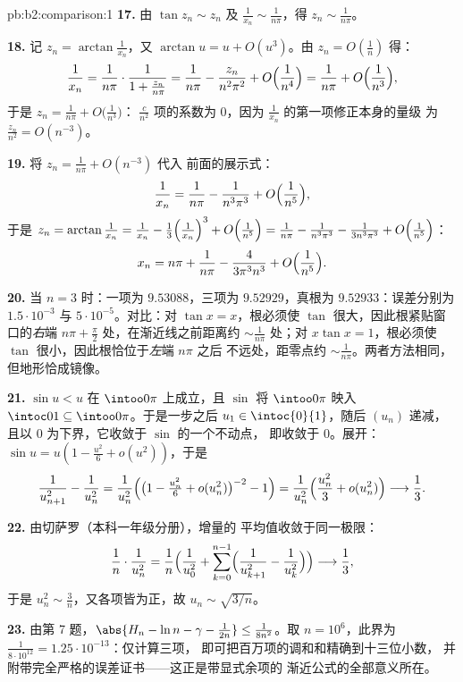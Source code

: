 \begin{solution}{pb:b2:comparison:1}
\textbf{17.} 由 $\tan z_n \sim z_n$ 及 $\frac1{x_n} \sim
\frac1{n\pi}$，得 $z_n \sim \frac1{n\pi}$。

\textbf{18.} 记 $z_n = \arctan\frac1{x_n}$，又 $\arctan u = u +
O(u^3)$。由 $z_n = O(\frac1n)$ 得：
\[
\frac1{x_n} = \frac{1}{n\pi}\cdot\frac1{1 + \frac{z_n}{n\pi}}
= \frac1{n\pi} - \frac{z_n}{n^2\pi^2} +
O\Bigl(\frac1{n^4}\Bigr)
= \frac1{n\pi} + O\Bigl(\frac1{n^3}\Bigr),
\]
于是 $z_n = \frac1{n\pi} + O\bigl(\frac1{n^3}\bigr)$：
$\frac{c}{n^2}$ 项的系数为 $0$，因为
$\frac1{x_n}$ 的第一项修正本身的量级
为 $\frac{z_n}{n^2} = O(n^{-3})$。

\textbf{19.} 将 $z_n = \frac1{n\pi} + O(n^{-3})$ 代入
前面的展示式：
\[
\frac{1}{x_n} = \frac{1}{n\pi} - \frac{1}{n^3\pi^3} +
O\Bigl(\frac1{n^5}\Bigr),
\]
于是 $z_n = \arctan\frac1{x_n} = \frac1{x_n} -
\frac{1}{3}\Bigl(\frac1{x_n}\Bigr)^3 + O\Bigl(\frac1{n^5}\Bigr)
= \frac1{n\pi} - \frac{1}{n^3\pi^3} - \frac{1}{3n^3\pi^3} +
O\Bigl(\frac1{n^5}\Bigr)$：
\[
x_n = n\pi + \frac{1}{n\pi} - \frac{4}{3\pi^3n^3} +
O\Bigl(\frac1{n^5}\Bigr).
\]

\textbf{20.} 当 $n = 3$ 时：一项为 $9.53088$，三项为
$9.52929$，真根为 $9.52933$：误差分别为 $1.5\cdot10^{-3}$ 与
$5\cdot10^{-5}$。对比：对 $\tan x = x$，根必须使
$\tan$ 很大，因此根紧贴窗口的\emph{右}端 $n\pi +
\frac\pi2$ 处，在渐近线之前距离约 $\sim\frac1{n\pi}$
处；对 $x\tan x = 1$，根必须使
$\tan$ 很小，因此根恰位于\emph{左}端 $n\pi$ 之后
不远处，距零点约 $\sim\frac1{n\pi}$。两者方法相同，
但地形恰成镜像。

\textbf{21.} $\sin u < u$ 在 $\intoo0\pi$ 上成立，且 $\sin$ 将
$\intoo0\pi$ 映入 $\intoc01 \subseteq \intoo0\pi$。于是一步之后
$u_1 \in \intoc{0}{1}$，随后 $(u_n)$ 递减，
且以 $0$ 为下界，它收敛于 $\sin$ 的一个不动点，
即收敛于 $0$。展开：$\sin u = u(1 - \frac{u^2}6 +
o(u^2))$，于是
\[
\frac{1}{u_{n+1}^2} - \frac1{u_n^2}
= \frac{1}{u_n^2}\Bigl(\bigl(1 - \tfrac{u_n^2}6 +
o(u_n^2)\bigr)^{-2} - 1\Bigr)
= \frac{1}{u_n^2}\Bigl(\frac{u_n^2}{3} + o(u_n^2)\Bigr)
\longrightarrow \frac13 .
\]

\textbf{22.} 由切萨罗（本科一年级分册），增量的
平均值收敛于同一极限：
\[
\frac{1}{n}\cdot\frac{1}{u_n^2}
= \frac1n\Bigl(\frac1{u_0^2} + \sum_{k=0}^{n-1}
\Bigl(\frac1{u_{k+1}^2} - \frac1{u_k^2}\Bigr)\Bigr)
\longrightarrow \frac13 ,
\]
于是 $u_n^2 \sim \frac3n$，又各项皆为正，故 $u_n
\sim \sqrt{3/n}$。

\textbf{23.} 由第 7 题，$\abs{H_n - \ln n - \gamma -
\frac1{2n}} \leq \frac1{8n^2}$。取 $n = 10^6$，此界为
$\frac{1}{8\cdot10^{12}} = 1.25\cdot10^{-13}$：仅计算三项，
即可把百万项的调和和精确到十三位小数，
并附带完全严格的误差证书——这正是带显式余项的
渐近公式的全部意义所在。


\end{solution}
